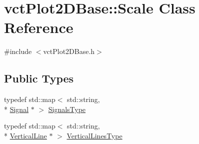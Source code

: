 \hypertarget{classvct_plot2_d_base_1_1_scale}{\section{vct\-Plot2\-D\-Base\-:\-:Scale Class Reference}
\label{classvct_plot2_d_base_1_1_scale}
}


{\ttfamily \#include $<$vct\-Plot2\-D\-Base.\-h$>$}

\subsection*{Public Types}
\begin{DoxyCompactItemize}
\item 
typedef std\-::map$<$ std\-::string, \\*
\hyperlink{classvct_plot2_d_base_1_1_signal}{Signal} $\ast$ $>$ \hyperlink{classvct_plot2_d_base_1_1_scale_aecdc247557c6ec3b7976596b42a4bc27}{Signals\-Type}
\item 
typedef std\-::map$<$ std\-::string, \\*
\hyperlink{classvct_plot2_d_base_1_1_vertical_line}{Vertical\-Line} $\ast$ $>$ \hyperlink{classvct_plot2_d_base_1_1_scale_acd4d4d528f1381dfd1145ceec34b25ba}{Vertical\-Lines\-Type}
\end{DoxyCompactItemize}
